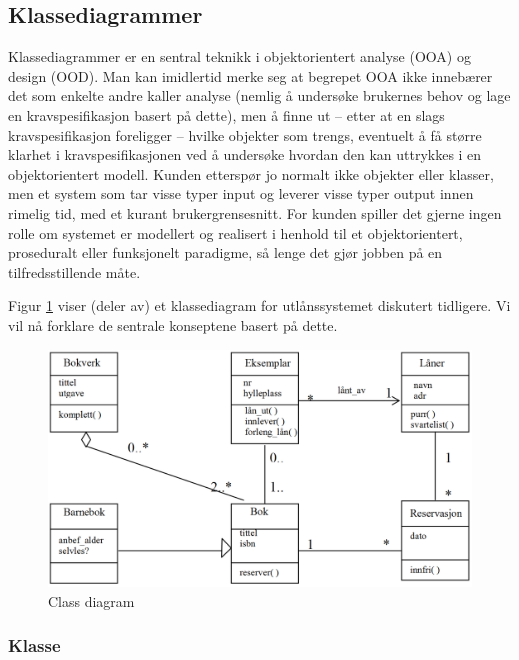 \subsection{Klassediagrammer}

Klassediagrammer er en sentral teknikk i objektorientert analyse (OOA) og design (OOD). Man kan imidlertid merke seg at begrepet OOA ikke innebærer det som enkelte andre kaller analyse (nemlig å undersøke brukernes behov og lage en kravspesifikasjon basert på dette), men å finne ut – etter at en slags kravspesifikasjon foreligger – hvilke objekter som trengs, eventuelt å få større klarhet i kravspesifikasjonen ved å undersøke hvordan den kan uttrykkes i en objektorientert modell. Kunden etterspør jo normalt ikke objekter eller klasser, men et system som tar visse typer input og leverer visse typer output innen rimelig tid, med et kurant brukergrensesnitt. For kunden spiller det gjerne ingen rolle om systemet er modellert og realisert i henhold til et objektorientert, proseduralt eller funksjonelt paradigme, så lenge det gjør jobben på en tilfredsstillende måte.

Figur \ref{fig:class-diagram-example} viser (deler av) et klassediagram for utlånssystemet diskutert tidligere. Vi vil nå forklare de sentrale konseptene basert på dette.

\begin{figure}[H]
    \centering
    \includegraphics[scale=0.35]{resources/class-diagram-example.PNG}
    \caption{Class diagram}
    \label{fig:class-diagram-example}
\end{figure}

\subsubsection{Klasse}

